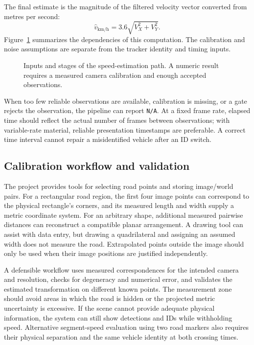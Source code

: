 The final estimate is the magnitude of the filtered velocity vector converted from metres per second:
\begin{equation}
\widehat v_{\mathrm{km/h}}=3.6\sqrt{V_X^2+V_Y^2}.
\end{equation}
Figure~\ref{fig:speed-filter} summarizes the dependencies of this computation. The calibration and noise assumptions are separate from the tracker identity and timing inputs.
\begin{figure}[htbp]
\centering

\caption{Inputs and stages of the speed-estimation path. A numeric result requires a measured camera calibration and enough accepted observations.}
\label{fig:speed-filter}
\end{figure}
When too few reliable observations are available, calibration is missing, or a gate rejects the observation, the pipeline can report \texttt{N/A}. At a fixed frame rate, elapsed time should reflect the actual number of frames between observations; with variable-rate material, reliable presentation timestamps are preferable. A correct time interval cannot repair a misidentified vehicle after an ID switch.

\subsection{Calibration workflow and validation}
The project provides tools for selecting road points and storing image/world pairs. For a rectangular road region, the first four image points can correspond to the physical rectangle's corners, and its measured length and width supply a metric coordinate system. For an arbitrary shape, additional measured pairwise distances can reconstruct a compatible planar arrangement. A drawing tool can assist with data entry, but drawing a quadrilateral and assigning an assumed width does not measure the road. Extrapolated points outside the image should only be used when their image positions are justified independently.

A defensible workflow uses measured correspondences for the intended camera and resolution, checks for degeneracy and numerical error, and validates the estimated transformation on different known points. The measurement zone should avoid areas in which the road is hidden or the projected metric uncertainty is excessive. If the scene cannot provide adequate physical information, the system can still show detections and IDs while withholding speed. Alternative segment-speed evaluation using two road markers also requires their physical separation and the same vehicle identity at both crossing times.
